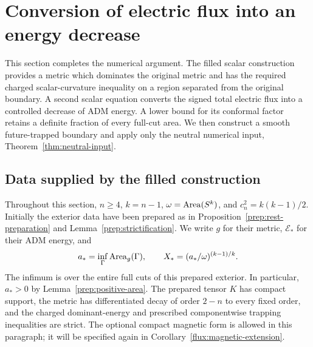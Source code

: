 \section{Conversion of electric flux into an energy decrease}
\label{sec:flux-conversion}

This section completes the numerical argument.  The filled scalar construction
provides a metric which dominates the original metric and has the required
charged scalar-curvature inequality on a region separated from the original
boundary.  A second scalar equation converts the signed total electric flux
into a controlled decrease of ADM energy.  A lower bound for its conformal
factor retains a definite fraction of every full-cut area.  We then construct
a smooth future-trapped boundary and apply only the neutral numerical input,
Theorem~\ref{thm:neutral-input}.

\subsection{Data supplied by the filled construction}
\label{flux:setup}

Throughout this section, $n\geq4$, $k=n-1$, $\omega=\operatorname{Area}(S^k)$, and
$c_n^2=k(k-1)/2$.  Initially the exterior data have been prepared as in
Proposition~\ref{prep:rest-preparation} and
Lemma~\ref{prep:strictification}.  We write $g$ for their metric,
$\mathcal E_*$ for their ADM energy, and
\begin{equation}
 a_* = \inf_{\Gamma}\operatorname{Area}_g(\Gamma),
 \qquad X_* = (a_*/\omega)^{(k-1)/k}.
 \label{flux:prepared-area}
\end{equation}
The infimum is over the entire full cuts of this prepared exterior.  In
particular, $a_*>0$ by Lemma~\ref{prep:positive-area}.  The prepared tensor
$K$ has compact support, the metric has differentiated decay of order
$2-n$ to every fixed order, and the charged dominant-energy and prescribed
componentwise trapping inequalities are strict.  The optional compact
magnetic form is allowed in this paragraph; it will be specified again in
Corollary~\ref{flux:magnetic-extension}.


